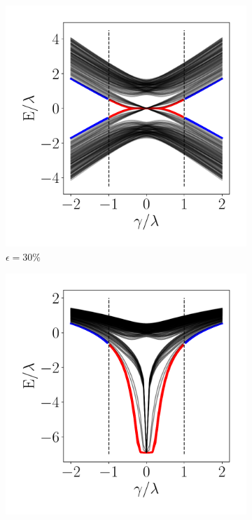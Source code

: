 \begin{figure}[tbh!]
     \begin{minipage}[h!]{0.9\textwidth}
         \begin{subfigure}[b!]{0.3 \textwidth}
            \caption{$\epsilon = 30\%$}             \includegraphics[width=\textwidth]{Imagenes/Resultados_Hoti_Fractal/bands_square_shh_0.3.pdf}
         \end{subfigure}\hspace*{-0.5em}
         \begin{subfigure}[b!]{0.3 \textwidth}
            \caption*{}
            \includegraphics[width=\textwidth]{Imagenes/Resultados_Hoti_Fractal/bands_square_shh_log0.3.pdf}

\end{subfigure}
\end{minipage}
\end{figure}
